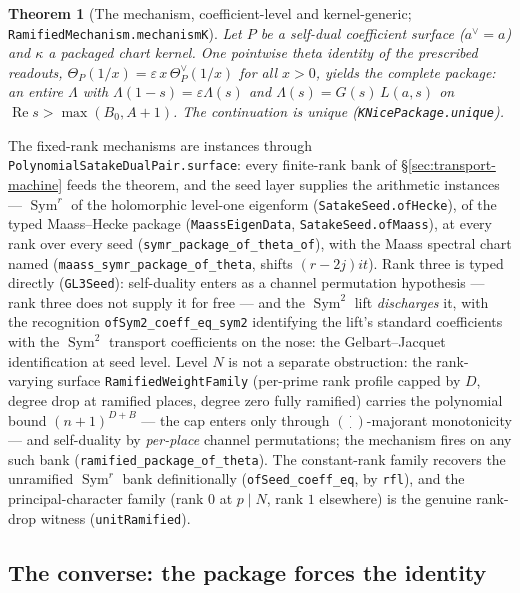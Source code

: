 \documentclass[11pt]{article}
\newtheorem{theorem}{Theorem}
\theoremstyle{definition}
\renewcommand{\Re}{\operatorname{Re}}
\newcommand{\Sym}{\operatorname{Sym}}
\begin{document}
\begin{theorem}[The mechanism, coefficient-level and kernel-generic;
\texttt{RamifiedMechanism.mechanismK}]\label{thm:mechanismK}
Let $P$ be a self-dual coefficient surface ($a^\vee=a$) and $\kappa$ a packaged chart
kernel.  One pointwise theta identity of the prescribed readouts,
$\Theta_P(1/x)=\varepsilon\,x\,\Theta_P^\vee(1/x)$ for all $x>0$, yields the complete
package: an entire $\Lambda$ with $\Lambda(1-s)=\varepsilon\Lambda(s)$ and
$\Lambda(s)=G(s)\,L(a,s)$ on $\Re s>\max(B_0,A+1)$.  The continuation is unique
(\texttt{KNicePackage.unique}).
\end{theorem}

The fixed-rank mechanisms are instances through
\texttt{PolynomialSatakeDualPair.surface}: every finite-rank bank of
\S\ref{sec:transport-machine} feeds the theorem, and the seed layer supplies the
arithmetic instances --- $\Sym^r$ of the holomorphic level-one eigenform
(\texttt{SatakeSeed.ofHecke}), of the typed Maass--Hecke package
(\texttt{MaassEigenData}, \texttt{SatakeSeed.ofMaass}), at every rank over every seed
(\texttt{symr\_package\_of\_theta\_of}), with the Maass spectral chart named
(\texttt{maass\_symr\_package\_of\_theta}, shifts $(r-2j)it$).  Rank three is typed
directly (\texttt{GL3Seed}): self-duality enters as a channel permutation hypothesis
--- rank three does not supply it for free --- and the $\Sym^2$ lift \emph{discharges}
it, with the recognition \texttt{ofSym2\_coeff\_eq\_sym2} identifying the lift's
standard coefficients with the $\Sym^2$ transport coefficients on the nose: the
Gelbart--Jacquet identification at seed level.  Level $N$ is not a separate
obstruction: the rank-varying surface \texttt{RamifiedWeightFamily} (per-prime rank
profile capped by $D$, degree drop at ramified places, degree zero fully ramified)
carries the polynomial bound $(n+1)^{D+B}$ --- the cap enters only through
$\binom{\cdot}{\cdot}$-majorant monotonicity --- and self-duality by \emph{per-place}
channel permutations; the mechanism fires on any such bank
(\texttt{ramified\_package\_of\_theta}).  The constant-rank family recovers the
unramified $\Sym^r$ bank definitionally (\texttt{ofSeed\_coeff\_eq}, by \texttt{rfl}),
and the principal-character family (rank $0$ at $p\mid N$, rank $1$ elsewhere) is the
genuine rank-drop witness (\texttt{unitRamified}).

\subsection*{The converse: the package forces the identity}
\end{document}
